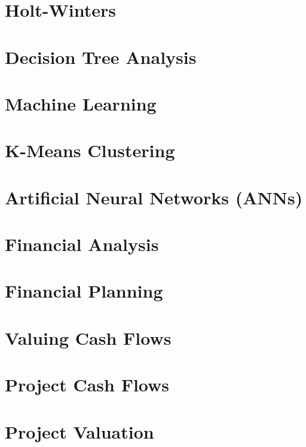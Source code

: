 \documentclass{article}
\begin{document}
\section{Holt-Winters}

\section{Decision Tree Analysis}

\section{Machine Learning}

\section{K-Means Clustering}

\section{Artificial Neural Networks (ANNs)}

\section{Financial Analysis}

\section{Financial Planning}

\section{Valuing Cash Flows}

\section{Project Cash Flows}

\section{Project Valuation}
\end{document}
